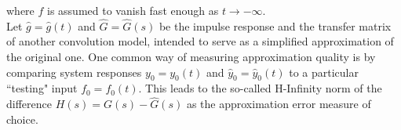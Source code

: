 %
where \(f\) is assumed to vanish fast enough as \(t \rightarrow -\infty\).\\
Let \(\hat{g} = \hat{g}(t)\) and \(\hat{G} = \hat{G}(s)\) be the impulse
response and the transfer matrix of another convolution model, intended to
serve as a simplified approximation of the original one.
One common way of measuring approximation quality is by comparing system
responses \(y_{0} = y_{0}(t)\) and \(\hat{y}_{0} = \hat{y}_{0}(t)\) to a
particular ``testing" input \(f_{0} = f_{0}(t)\).
This leads to the so-called H-Infinity norm of the difference
 \(H(s) = G(s) - \hat{G}(s)\) as the approximation error measure of choice.
